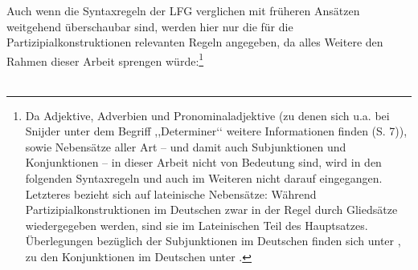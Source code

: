 \documentclass[12pt,a4paper]{article}
\begin{document}
Auch wenn die Syntaxregeln der LFG verglichen mit früheren Ansätzen weitgehend überschaubar sind, werden hier nur die für die Partizipialkonstruktionen relevanten Regeln angegeben, da alles Weitere den Rahmen dieser Arbeit sprengen würde:\footnote{Da Adjektive, Adverbien und Pronominaladjektive (zu denen sich u.a. bei Snijder unter dem Begriff ,,Determiner‘‘ weitere Informationen finden (S. 7)), sowie Nebensätze aller Art  -- und damit auch Subjunktionen und Konjunktionen -- in dieser Arbeit nicht von Bedeutung sind, wird in den folgenden Syntaxregeln und auch im Weiteren nicht darauf eingegangen. Letzteres bezieht sich auf lateinische Nebensätze: Während Partizipialkonstruktionen im Deutschen zwar in der Regel durch Gliedsätze wiedergegeben werden, sind sie im Lateinischen Teil des Hauptsatzes. Überlegungen bezüglich der Subjunktionen im Deutschen finden sich unter \cite[103-119]{Skript}, zu den Konjunktionen im Deutschen unter \cite[120-136]{Skript}.} 
\\
\\
\end{document}
